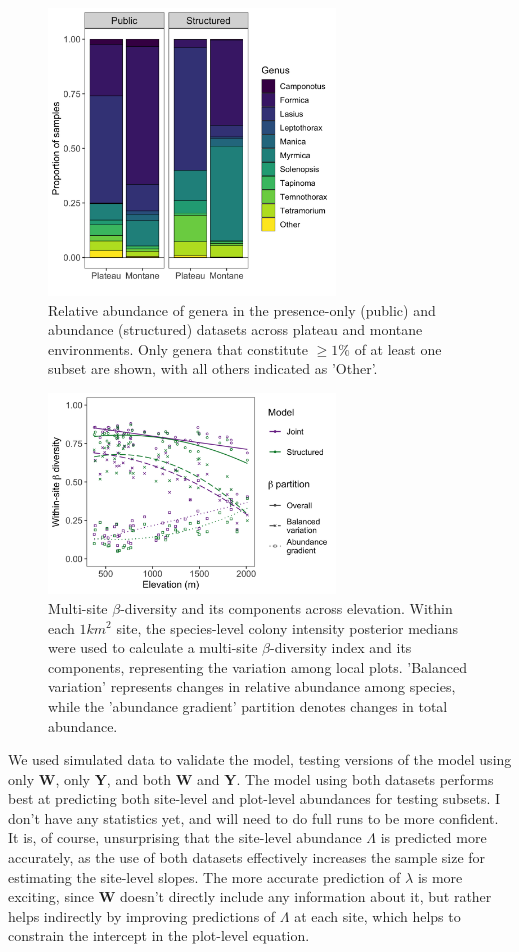 \documentclass[preprint,review,times,12pt]{elsarticle}
\begin{document}
\begin{figure}
	\centering\includegraphics[width=3in]{ms/1_Ecography/1/figs/genus_assemblages.png}
	\caption{\label{fig:genus_assemblages} Relative abundance of genera in the presence-only (public) and abundance (structured) datasets across plateau and montane environments. Only genera that constitute $\geq 1\%$ of at least one subset are shown, with all others indicated as 'Other'.}
\end{figure}

\begin{figure}
\centering\includegraphics[width=3in]{ms/1_Ecography/1/figs/beta_diversity.png}
\caption{\label{fig:beta_div} Multi-site $\beta$-diversity and its components across elevation. Within each $1 km^2$ site, the species-level colony intensity posterior medians were used to calculate a multi-site $\beta$-diversity index and its components, representing the variation among local plots. 'Balanced variation' represents changes in relative abundance among species, while the 'abundance gradient' partition denotes changes in total abundance.}
\end{figure}

We used simulated data to validate the model, testing versions of the model using only \textbf{W}, only \textbf{Y}, and both \textbf{W} and \textbf{Y}. The model using both datasets performs best at predicting both site-level and plot-level abundances for testing subsets. I don't have any statistics yet, and will need to do full runs to be more confident. It is, of course, unsurprising that the site-level abundance $\Lambda$ is predicted more accurately, as the use of both datasets effectively increases the sample size for estimating the site-level slopes. The more accurate prediction of $\lambda$ is more exciting, since \textbf{W} doesn't directly include any information about it, but rather helps indirectly by improving predictions of $\Lambda$ at each site, which helps to constrain the intercept in the plot-level equation. 
\end{document}
